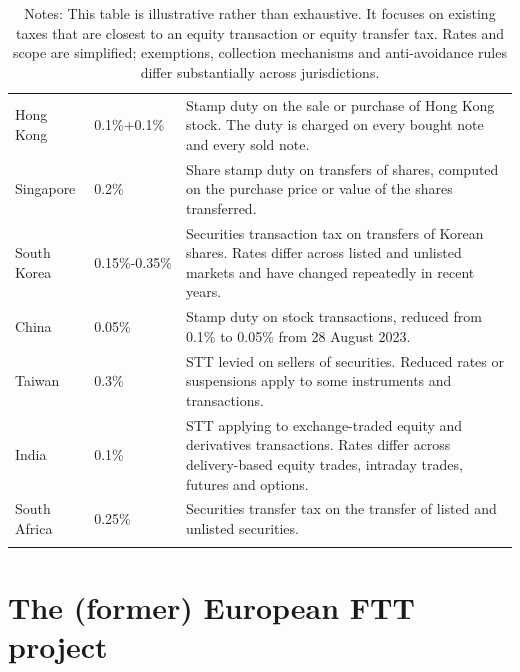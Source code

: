 \documentclass[../../main]{subfiles}
\begin{document}
\begin{table}[htbp]
\begin{tabularx}{\textwidth}{p{2.4cm} p{2.4cm} X}
\hline 

Hong Kong & 0.1\%+0.1\% &
Stamp duty on the sale or purchase of Hong Kong stock. The duty is charged on every bought note and every sold note. \\

Singapore & 0.2\% &
Share stamp duty on transfers of shares, computed on the purchase price or value of the shares transferred. \\

South Korea & 0.15\%-0.35\% &
Securities transaction tax on transfers of Korean shares. Rates differ across listed and unlisted markets and have changed repeatedly in recent years. \\

China & 0.05\% &
Stamp duty on stock transactions, reduced from 0.1\% to 0.05\% from 28 August 2023. \\

Taiwan & 0.3\% &
STT levied on sellers of securities. Reduced rates or suspensions apply to some instruments and transactions. \\

India & 0.1\% &
STT applying to exchange-traded equity and derivatives transactions. Rates differ across delivery-based equity trades, intraday trades, futures and options. \\


South Africa & 0.25\% &
Securities transfer tax on the transfer of listed and unlisted securities. \\

 \\

\hline
\end{tabularx}

\caption*{\footnotesize Notes: This table is illustrative rather than exhaustive. It focuses on existing taxes that are closest to an equity transaction or equity transfer tax. Rates and scope are simplified; exemptions, collection mechanisms and anti-avoidance rules differ substantially across jurisdictions.}

\end{table}


\newpage

\section{The (former) European FTT project}
\end{document}
